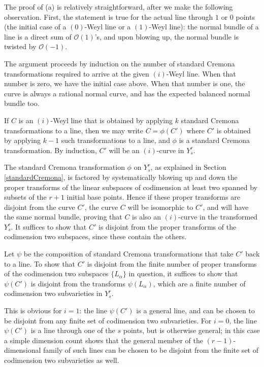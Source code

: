 \documentclass[10pt,a4paper]{amsart}
\def\calO{\mathcal{O}}
\begin{document}
\medskip{}
The proof of (a) is relatively straightforward, after we make the following observation.
First, the statement is true for the actual line through $1$ or $0$ points (the initial case of a $(0)$-Weyl line or a $(1)$-Weyl line): the normal bundle of a line is a direct sum of $\calO(1)$'s, and upon blowing up, the normal bundle is twisted by $\calO(-1)$.

The argument proceeds by induction on the number of standard Cremona transformations required to arrive at the given $(i)$-Weyl line.  When that number is zero, we have the initial case above.  When that number is one, the curve is always a rational normal curve, and has the expected balanced normal bundle too.

If $C$ is an $(i)$-Weyl line that is obtained by applying $k$ standard Cremona transformations to a line, then we may write $C = \phi(C')$ where $C'$ is obtained by applying $k-1$ such transformations to a line, and $\phi$ is a standard Cremona transformation. By induction, $C'$ will be an $(i)$-curve in $Y^r_s$.

The standard Cremona transformation $\phi$ on $Y^r_s$,
as explained in Section \ref{standardCremona},
is factored by systematically blowing up and down the proper transforms of the linear subspaces of codimension at least two spanned by subsets of the $r+1$ initial base points.  Hence if these proper transforms are disjoint from the curve $C'$, the curve $C$ will be isomorphic to $C'$, and will have the same normal bundle, proving that $C$ is also an $(i)$-curve in the transformed $Y^r_s$.  It suffices to show that $C'$ is disjoint from the proper transforms of the codimension two subspaces, since these contain the others.

Let $\psi$ be the composition of standard Cremona transformations 
that take $C'$ back to a line.  
To show that $C'$ is disjoint from 
the finite number of proper transforms 
of the codimension two subspaces $\{L_\alpha\}$ in question, 
it suffices to show that $\psi(C')$ is disjoint from the transforms $\psi(L_\alpha)$,
which are a finite number of codimension two subvarieties in $Y^r_s$.

This is obvious for $i=1$: the line $\psi(C')$ is a general line, and can be chosen to be disjoint from any finite set of codimension two subvarieties.
For $i=0$, the line $\psi(C')$ is a line through one of the $s$ points, but is otherwise general;
in this case a simple dimension count shows that the general member of the $(r-1)$-dimensional family of such lines can be chosen to be disjoint from the finite set of codimension two subvarieties as well.
\end{document}
